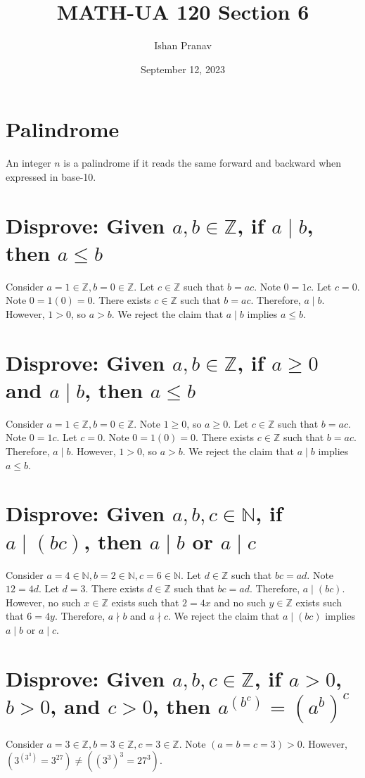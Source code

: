 \documentclass[12pt]{article}
\title{MATH-UA 120 Section 6}
\author{Ishan Pranav}
\date{September 12, 2023}
\begin{document}
\maketitle
\section*{Palindrome}
An integer $n$ is a palindrome if it reads the same forward and backward when expressed in base-10.
\section{Disprove: Given $a,b\in\mathbb{Z}$, if $a \mid b$, then $a\leq b$}
Consider $a=1\in\mathbb{Z},b=0\in\mathbb{Z}$. Let $c\in\mathbb{Z}$ such that $b=ac$. Note $0=1c$. Let $c=0$. Note $0=1(0)=0$. There exists $c\in\mathbb{Z}$ such that $b=ac$. Therefore, $a \mid b$. However, $1>0$, so $a>b$. We reject the claim that $a \mid b$ implies $a\leq b$.
\section{Disprove: Given $a,b\in\mathbb{Z}$, if $a\geq 0$ and $a \mid b$, then $a\leq b$}
Consider $a=1\in\mathbb{Z},b=0\in\mathbb{Z}$. Note $1\geq 0$, so $a\geq 0$. Let $c\in\mathbb{Z}$ such that $b=ac$. Note $0=1c$. Let $c=0$. Note $0=1(0)=0$. There exists $c\in\mathbb{Z}$ such that $b=ac$. Therefore, $a \mid b$. However, $1>0$, so $a>b$. We reject the claim that $a \mid b$ implies $a\leq b$.
\section{Disprove: Given $a,b,c\in\mathbb{N}$, if $a \mid (bc)$, then $a \mid b$ or $a \mid c$}
Consider $a=4\in\mathbb{N},b=2\in\mathbb{N},c=6\in\mathbb{N}$. Let $d\in\mathbb{Z}$ such that $bc=ad$. Note $12=4d$. Let $d=3$. There exists $d\in\mathbb{Z}$ such that $bc=ad$. Therefore, $a \mid (bc)$. However, no such $x\in\mathbb{Z}$ exists such that $2=4x$ and no such $y\in\mathbb{Z}$ exists such that $6=4y$. Therefore, $a \nmid b$ and $a \nmid c$. We reject the claim that $a \mid (bc)$ implies $a \mid b$ or $a \mid c$.
\section{Disprove: Given $a,b,c\in\mathbb{Z}$, if $a>0$, $b>0$, and $c>0$, then $a^{\left(b^c\right)}=\left(a^b\right)^c$}
Consider $a=3\in\mathbb{Z},b=3\in\mathbb{Z},c=3\in\mathbb{Z}$. Note $(a=b=c=3)>0$. However, $\left(3^{\left(3^3\right)}=3^{27}\right)\neq\left(\left(3^3\right)^3=27^3\right)$.
\end{document}
